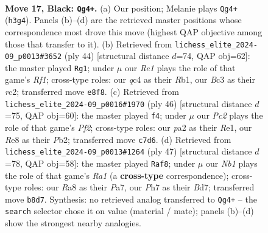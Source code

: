 \documentclass[11pt]{article}
\begin{document}
\clearpage

\begin{figure}[p]\centering
\begin{subfigure}{0.46\textwidth}\centering
\resizebox{\linewidth}{!}{%
\newchessgame
\chessboard[
  setfen={rn2r1k1/p1p1Bp1p/3P2p1/8/2Q1P3/2b4q/P4P1P/R4RK1 b - - 0 17},
  showmover=false,
  pgfstyle=straightmove, color=movearrow, markmove={h3-g4}
]}
\caption{}
\end{subfigure}\hfill
\begin{subfigure}{0.46\textwidth}\centering
\resizebox{\linewidth}{!}{%
\newchessgame
\chessboard[
  setfen={2r3k1/pp3p1p/q5p1/8/4PB2/1Q3P1P/Pbr3P1/1R3R1K w - - 4 23},
  showmover=false,
  pgfstyle=straightmove, color=movearrow, markmove={f1-g1}
]}
\caption{}
\end{subfigure}
\\[4pt]
\begin{subfigure}{0.46\textwidth}\centering
\resizebox{\linewidth}{!}{%
\newchessgame
\chessboard[
  setfen={2b1rrk1/pp5p/3Qp1p1/q2p4/3N4/P1P1R3/1P3PPP/2K1R3 w - - 5 24},
  showmover=false,
  pgfstyle=straightmove, color=movearrow, markmove={f2-f4}
]}
\caption{}
\end{subfigure}\hfill
\begin{subfigure}{0.46\textwidth}\centering
\resizebox{\linewidth}{!}{%
\newchessgame
\chessboard[
  setfen={r6k/p1pb1r1p/2p1pP1Q/8/7P/2qB4/P1P3P1/4RRK1 b - - 0 24},
  showmover=false,
  pgfstyle=straightmove, color=movearrow, markmove={a8-f8}
]}
\caption{}
\end{subfigure}
\caption{\textbf{Move 17, Black: \texttt{Qg4+}.} (a) Our position; Melanie plays \texttt{Qg4+} (\texttt{h3g4}). Panels (b)--(d) are the retrieved master positions whose correspondence most drove this move (highest QAP objective among those that transfer to it). (b) Retrieved from \texttt{lichess\_elite\_2024-09\_p0013\#3652} (ply 44) [structural distance $d$=74, QAP obj=62]: the master played \texttt{Rg1}; under $\mu$ our \emph{Re1} plays the role of that game's \emph{Rf1}; cross-type roles: our \emph{q}c4 as their \emph{R}b1, our \emph{B}c3 as their \emph{r}c2; transferred move \texttt{e8f8}. (c) Retrieved from \texttt{lichess\_elite\_2024-09\_p0016\#1970} (ply 46) [structural distance $d$=75, QAP obj=60]: the master played \texttt{f4}; under $\mu$ our \emph{Pc2} plays the role of that game's \emph{Pf2}; cross-type roles: our \emph{p}a2 as their \emph{R}e1, our \emph{R}e8 as their \emph{P}b2; transferred move \texttt{c7d6}. (d) Retrieved from \texttt{lichess\_elite\_2024-09\_p0013\#1264} (ply 47) [structural distance $d$=78, QAP obj=58]: the master played \texttt{Raf8}; under $\mu$ our \emph{Nb1} plays the role of that game's \emph{Ra1} (a \textbf{cross-type} correspondence); cross-type roles: our \emph{R}a8 as their \emph{P}a7, our \emph{P}h7 as their \emph{B}d7; transferred move \texttt{b8d7}. Synthesis: no retrieved analog transferred to \texttt{Qg4+} -- the \texttt{search} selector chose it on value (material / mate); panels (b)--(d) show the strongest nearby analogies.}
\label{fig:thought-m33}
\end{figure}
\end{document}
